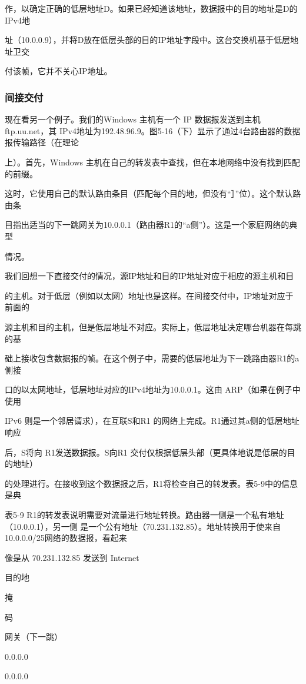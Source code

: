 作，以确定正确的低层地址D。如果已经知道该地址，数据报中的目的地址是D的IPv4地

址（10.0.0.9），并将D放在低层头部的目的IP地址字段中。这台交换机基于低层地址卫交

付该帧，它并不关心IP地址。

\subsubsection{间接交付}
现在看另一个例子。我们的Windows 主机有一个 IP 数据报发送到主机 ftp.uu.net，其
IPv4地址为192.48.96.9。图5-16（下）显示了通过4台路由器的数据报传输路径（在理论

上）。首先，Windows 主机在自己的转发表中查找，但在本地网络中没有找到匹配的前缀。

这时，它使用自己的默认路由条目（匹配每个目的地，但没有“］”位）。这个默认路由条

目指出适当的下一跳网关为10.0.0.1（路由器R1的“a侧”）。这是一个家庭网络的典型

情况。

我们回想一下直接交付的情况，源IP地址和目的IP地址对应于相应的源主机和目

的主机。对于低层（例如以太网）地址也是这样。在间接交付中，IP地址对应于前面的

源主机和目的主机，但是低层地址不对应。实际上，低层地址决定哪台机器在每跳的基

础上接收包含数据报的帧。在这个例子中，需要的低层地址为下一跳路由器R1的a侧接

口的以太网地址，低层地址对应的IPv4地址为10.0.0.1。这由 ARP（如果在例子中使用

IPv6 则是一个邻居请求），在互联S和R1 的网络上完成。R1通过其a侧的低层地址响应

后，S将向 R1发送数据报。S向R1 交付仅根据低层头部（更具体地说是低层的目的地址）

的处理进行。在接收到这个数据报之后，R1将检查自己的转发表。表5-9中的信息是典

表5-9 R1的转发表说明需要对流量进行地址转换。路由器一侧是一个私有地址（10.0.0.1），另一侧
是一个公有地址（70.231.132.85）。地址转换用于使来自10.0.0.0/25网络的数据报，看起来

像是从 70.231.132.85 发送到 Internet

目的地

掩

码

网关（下一跳）

0.0.0.0

0.0.0.0

